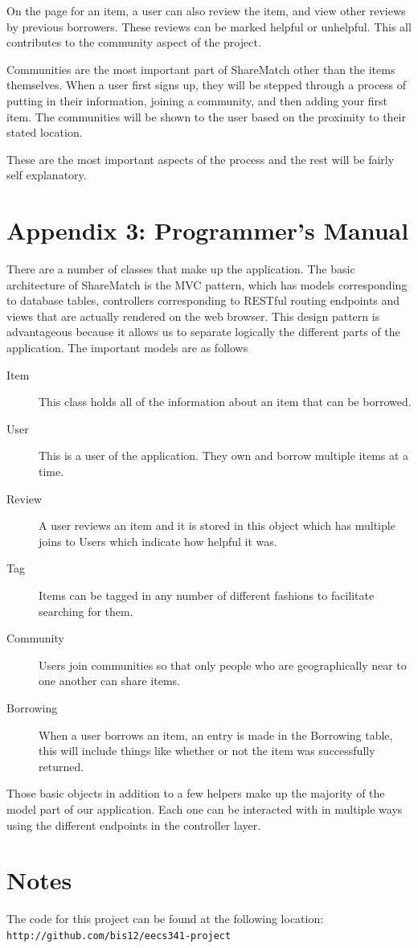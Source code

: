 \documentclass{acm_proc_article-sp}
\begin{document}
On the page for an item, a user can also review the item, and view other reviews by previous borrowers.   These reviews can be marked helpful or unhelpful.  This all contributes to the community aspect of the project.  

Communities are the most important part of ShareMatch other than the items themselves.  When a user first signs up, they will be stepped through a process of putting in their information, joining a community, and then adding your first item.  The communities will be shown to the user based on the proximity to their stated location.

These are the most important aspects of the process and the rest will be fairly self explanatory.
\section{Appendix 3: Programmer's Manual}
There are a number of classes that make up the application.  The basic architecture of ShareMatch is the MVC pattern, which has models corresponding to database tables, controllers corresponding to RESTful routing endpoints and views that are actually rendered on the web browser.  This design pattern is advantageous because it allows us to separate logically the different parts of the application.  The important models are as follows

\begin{description}
\item[Item] This class holds all of the information about an item that can be borrowed.
\item[User] This is a user of the application. They own and borrow multiple items at a time.
\item[Review] A user reviews an item and it is stored in this object which has multiple joins to Users which indicate how helpful it was.
\item[Tag] Items can be tagged in any number of different fashions to facilitate searching for them.
\item[Community] Users join communities so that only people who are geographically near to one another can share items.
\item[Borrowing]  When a user borrows an item, an entry is made in the Borrowing table, this will include things like whether or not the item was successfully returned.
\end{description}

Those basic objects in addition to a few helpers make up the majority of the model part of our application.  Each one can be interacted with in multiple ways using the different endpoints in the controller layer.


\section*{Notes}
The code for this project can be found at the following location:\\
\texttt{http://github.com/bis12/eecs341-project}
\end{document}
